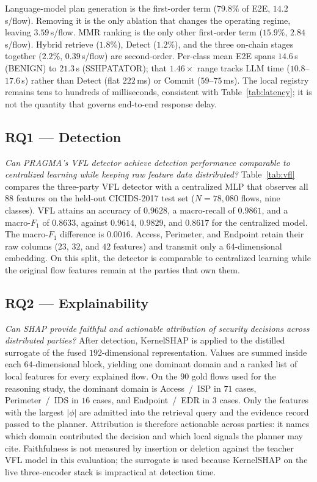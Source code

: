 \documentclass[10pt, conference]{IEEEtran}
\begin{document}
Language-model plan generation is the first-order term ($79.8\%$ of E2E, $14.2$\,s/flow). Removing it is the only ablation that changes the operating regime, leaving $3.59$\,s/flow. MMR ranking is the only other first-order term ($15.9\%$, $2.84$\,s/flow). Hybrid retrieve ($1.8\%$), Detect ($1.2\%$), and the three on-chain stages together ($2.2\%$, $0.39$\,s/flow) are second-order. Per-class mean E2E spans $14.6$\,s (BENIGN) to $21.3$\,s (SSHPATATOR); that $1.46\times$ range tracks LLM time ($10.8$--$17.6$\,s) rather than Detect (flat $222$\,ms) or Commit ($59$--$75$\,ms). The local registry remains tens to hundreds of milliseconds, consistent with Table~\ref{tab:latency}; it is not the quantity that governs end-to-end response delay.

\subsection{RQ1 --- Detection}
\label{sec:rq1}

\textit{Can PRAGMA's VFL detector achieve detection performance comparable to centralized learning while keeping raw feature data distributed?}
Table~\ref{tab:vfl} compares the three-party VFL detector with a centralized MLP that observes all $88$ features on the held-out CICIDS-2017 test set ($N{=}78{,}080$ flows, nine classes). VFL attains an accuracy of $0.9628$, a macro-recall of $0.9861$, and a macro-$F_1$ of $0.8633$, against $0.9614$, $0.9829$, and $0.8617$ for the centralized model. The macro-$F_1$ difference is $0.0016$. Access, Perimeter, and Endpoint retain their raw columns ($23$, $32$, and $42$ features) and transmit only a $64$-dimensional embedding. On this split, the detector is comparable to centralized learning while the original flow features remain at the parties that own them.

\subsection{RQ2 --- Explainability}
\label{sec:rq2}

\textit{Can SHAP provide faithful and actionable attribution of security decisions across distributed parties?}
After detection, KernelSHAP is applied to the distilled surrogate of the fused $192$-dimensional representation. Values are summed inside each $64$-dimensional block, yielding one dominant domain and a ranked list of local features for every explained flow. On the $90$ gold flows used for the reasoning study, the dominant domain is Access~/~ISP in $71$ cases, Perimeter~/~IDS in $16$ cases, and Endpoint~/~EDR in $3$ cases. Only the features with the largest $\lvert\phi\rvert$ are admitted into the retrieval query and the evidence record passed to the planner. Attribution is therefore actionable across parties: it names which domain contributed the decision and which local signals the planner may cite. Faithfulness is not measured by insertion or deletion against the teacher VFL model in this evaluation; the surrogate is used because KernelSHAP on the live three-encoder stack is impractical at detection time.
\end{document}

